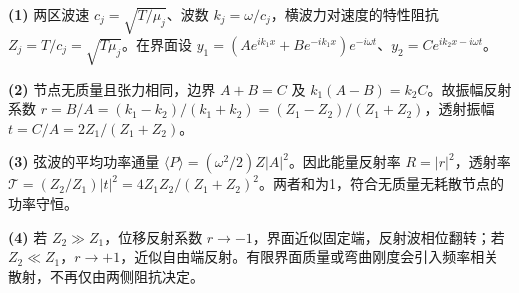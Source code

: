 \par\noindent\textbf{(1)} 两区波速 \(c_j=\sqrt{T/\mu_j}\)、波数 \(k_j=\omega/c_j\)，横波力对速度的特性阻抗 \(Z_j=T/c_j=\sqrt{T\mu_j}\)。在界面设 \(y_1=(Ae^{ik_1x}+Be^{-ik_1x})e^{-i\omega t}\)、\(y_2=Ce^{ik_2x-i\omega t}\)。
\par\noindent\textbf{(2)} 节点无质量且张力相同，边界 \(A+B=C\) 及 \(k_1(A-B)=k_2C\)。故振幅反射系数 \(r=B/A=(k_1-k_2)/(k_1+k_2)=(Z_1-Z_2)/(Z_1+Z_2)\)，透射振幅 \(t=C/A=2Z_1/(Z_1+Z_2)\)。
\par\noindent\textbf{(3)} 弦波的平均功率通量 \(\langle P\rangle=(\omega^2/2)Z|A|^2\)。因此能量反射率 \(R=|r|^2\)，透射率 \(\mathcal T=(Z_2/Z_1)|t|^2=4Z_1Z_2/(Z_1+Z_2)^2\)。两者和为1，符合无质量无耗散节点的功率守恒。
\par\noindent\textbf{(4)} 若 \(Z_2\gg Z_1\)，位移反射系数 \(r\to-1\)，界面近似固定端，反射波相位翻转；若 \(Z_2\ll Z_1\)，\(r\to+1\)，近似自由端反射。有限界面质量或弯曲刚度会引入频率相关散射，不再仅由两侧阻抗决定。
